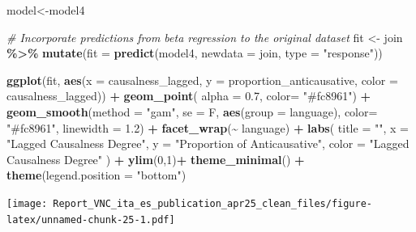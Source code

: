 \documentclass[
]{article}
\newenvironment{Shaded}{\begin{snugshade}}{\end{snugshade}}
\newcommand{\AttributeTok}[1]{\textcolor[rgb]{0.13,0.29,0.53}{#1}}
\newcommand{\CommentTok}[1]{\textcolor[rgb]{0.56,0.35,0.01}{\textit{#1}}}
\newcommand{\DecValTok}[1]{\textcolor[rgb]{0.00,0.00,0.81}{#1}}
\newcommand{\FloatTok}[1]{\textcolor[rgb]{0.00,0.00,0.81}{#1}}
\newcommand{\FunctionTok}[1]{\textcolor[rgb]{0.13,0.29,0.53}{\textbf{#1}}}
\newcommand{\NormalTok}[1]{#1}
\newcommand{\OtherTok}[1]{\textcolor[rgb]{0.56,0.35,0.01}{#1}}
\newcommand{\SpecialCharTok}[1]{\textcolor[rgb]{0.81,0.36,0.00}{\textbf{#1}}}
\newcommand{\StringTok}[1]{\textcolor[rgb]{0.31,0.60,0.02}{#1}}
\begin{document}
\begin{Shaded}
\begin{Highlighting}[]
\NormalTok{model}\OtherTok{\textless{}{-}}\NormalTok{model4}

\CommentTok{\# Incorporate predictions from beta regression to the original dataset}
\NormalTok{fit }\OtherTok{\textless{}{-}}\NormalTok{ join }\SpecialCharTok{\%\textgreater{}\%}
  \FunctionTok{mutate}\NormalTok{(}\AttributeTok{fit =} \FunctionTok{predict}\NormalTok{(model4, }\AttributeTok{newdata =}\NormalTok{ join, }\AttributeTok{type =} \StringTok{"response"}\NormalTok{))}

\FunctionTok{ggplot}\NormalTok{(fit, }\FunctionTok{aes}\NormalTok{(}\AttributeTok{x =}\NormalTok{ causalness\_lagged, }\AttributeTok{y =}\NormalTok{ proportion\_anticausative, }\AttributeTok{color =}\NormalTok{ causalness\_lagged)) }\SpecialCharTok{+}
  \FunctionTok{geom\_point}\NormalTok{( }\AttributeTok{alpha =} \FloatTok{0.7}\NormalTok{, }\AttributeTok{color=} \StringTok{"\#fc8961"}\NormalTok{) }\SpecialCharTok{+}  
  \FunctionTok{geom\_smooth}\NormalTok{(}\AttributeTok{method =} \StringTok{"gam"}\NormalTok{, }\AttributeTok{se =}\NormalTok{ F, }\FunctionTok{aes}\NormalTok{(}\AttributeTok{group =}\NormalTok{ language), }\AttributeTok{color=} \StringTok{"\#fc8961"}\NormalTok{, }\AttributeTok{linewidth =} \FloatTok{1.2}\NormalTok{) }\SpecialCharTok{+}  
    \FunctionTok{facet\_wrap}\NormalTok{(}\SpecialCharTok{\textasciitilde{}}\NormalTok{ language) }\SpecialCharTok{+}  
  \FunctionTok{labs}\NormalTok{(}
    \AttributeTok{title =} \StringTok{""}\NormalTok{,}
    \AttributeTok{x =} \StringTok{"Lagged Causalness Degree"}\NormalTok{,}
    \AttributeTok{y =} \StringTok{"Proportion of Anticausative"}\NormalTok{,}
    \AttributeTok{color =} \StringTok{"Lagged Causalness Degree"}
\NormalTok{  ) }\SpecialCharTok{+}
  \FunctionTok{ylim}\NormalTok{(}\DecValTok{0}\NormalTok{,}\DecValTok{1}\NormalTok{)}\SpecialCharTok{+}
  \FunctionTok{theme\_minimal}\NormalTok{() }\SpecialCharTok{+}
  \FunctionTok{theme}\NormalTok{(}\AttributeTok{legend.position =} \StringTok{"bottom"}\NormalTok{)}
\end{Highlighting}
\end{Shaded}

\texttt{[image: Report\_VNC\_ita\_es\_publication\_apr25\_clean\_files/figure-latex/unnamed-chunk-25-1.pdf]}
\end{document}
